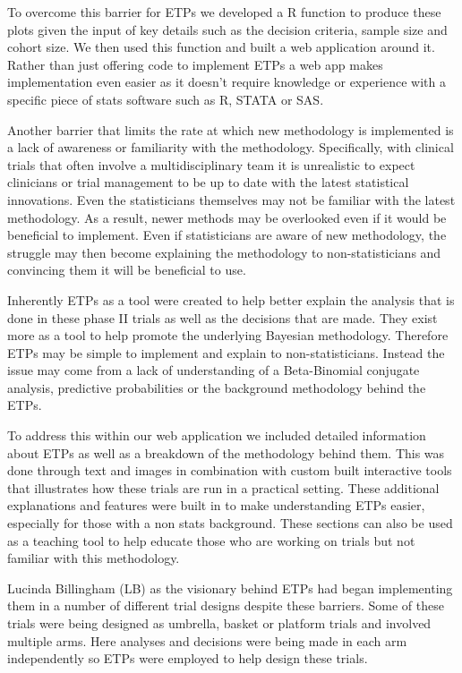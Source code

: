 To overcome this barrier for ETPs we developed a R function to produce these plots given the input of key details such as the decision criteria, sample size and cohort size. We then used this function and built a web application around it. Rather than just offering code to implement ETPs a web app makes implementation even easier as it doesn't require knowledge or experience with a specific piece of stats software such as R, STATA or SAS. 

Another barrier that limits the rate at which new methodology is implemented is a lack of awareness or familiarity with the methodology. Specifically, with clinical trials that often involve a multidisciplinary team it is unrealistic to expect clinicians or trial management to be up to date with the latest statistical innovations. Even the statisticians themselves may not be familiar with the latest methodology. As a result, newer methods may be overlooked even if it would be beneficial to implement. Even if statisticians are aware of new methodology, the struggle may then become explaining the methodology to non-statisticians and convincing them it will be beneficial to use. 

Inherently ETPs as a tool were created to help better explain the analysis that is done in these phase \RN{2} trials as well as the decisions that are made. They exist more as a tool to help promote the underlying Bayesian methodology. Therefore ETPs may be simple to implement and explain to non-statisticians. Instead the issue may come from a lack of understanding of a Beta-Binomial conjugate analysis, predictive probabilities or the background methodology behind the ETPs. 

To address this within our web application we included detailed information about ETPs as well as a breakdown of the methodology behind them. This was done through text and images in combination with custom built interactive tools that illustrates how these trials are run in a practical setting. These additional explanations and features were built in to make understanding ETPs easier, especially for those with a non stats background. These sections can also be used as a teaching tool to help educate those who are working on trials but not familiar with this methodology.  

Lucinda Billingham (LB) as the visionary behind ETPs had began implementing them in a number of different trial designs despite these barriers. Some of these trials were being designed as umbrella, basket or platform trials and involved multiple arms. Here analyses and decisions were being made in each arm independently so ETPs were employed to help design these trials. 

